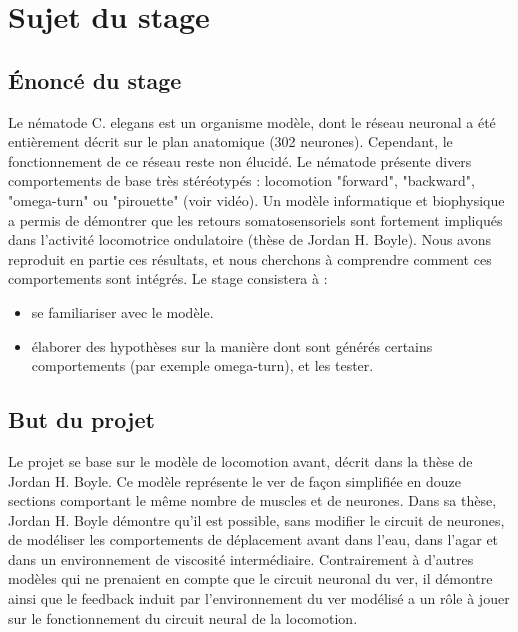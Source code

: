 \chapter{Sujet du stage} %
\label{cha:Sujet du stage}

\section{Énoncé du stage} %
\label{sec:Énoncé du stage}

Le nématode C. elegans est un organisme modèle, dont le réseau neuronal a été entièrement décrit sur le plan
anatomique (302 neurones). Cependant, le fonctionnement de ce réseau reste non élucidé. Le nématode présente
divers comportements de base très stéréotypés : locomotion "forward", "backward", "omega-turn" ou "pirouette"
(voir vidéo). Un modèle informatique et biophysique a permis de démontrer que les retours somatosensoriels
sont fortement impliqués dans l’activité locomotrice ondulatoire (thèse de Jordan H. Boyle). Nous avons
reproduit en partie ces résultats, et nous cherchons à comprendre comment ces comportements sont intégrés.
Le stage consistera à :
\begin{itemize}
   \item se familiariser avec le modèle.
   \item élaborer des hypothèses sur la manière dont sont générés certains comportements (par exemple
      omega-turn), et les tester.
\end{itemize}


\section{But du projet} %
\label{sec:But du projet}

Le projet se base sur le modèle de locomotion avant, décrit dans la thèse de Jordan H. Boyle\cite{Boyle2009}.
Ce modèle représente le ver de façon simplifiée en douze sections comportant le même nombre de muscles et de neurones.
Dans sa thèse, Jordan H. Boyle démontre qu'il est possible, sans modifier le circuit de neurones, de
modéliser les comportements de déplacement avant dans l'eau, dans l'agar et dans un environnement
de viscosité intermédiaire. Contrairement à d'autres modèles qui ne prenaient en compte que le circuit neuronal
du ver, il démontre ainsi que le feedback induit par l'environnement du ver modélisé a un rôle à jouer sur le
fonctionnement du circuit neural de la locomotion.

